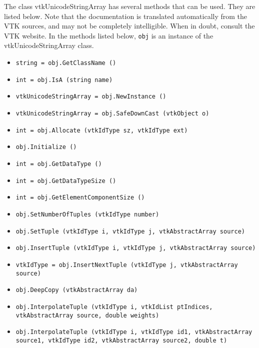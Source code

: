 The class vtkUnicodeStringArray has several methods that can be used.
  They are listed below.
Note that the documentation is translated automatically from the VTK sources,
and may not be completely intelligible.  When in doubt, consult the VTK website.
In the methods listed below, \verb|obj| is an instance of the vtkUnicodeStringArray class.
\begin{itemize}
\item  \verb|string = obj.GetClassName ()|

\item  \verb|int = obj.IsA (string name)|

\item  \verb|vtkUnicodeStringArray = obj.NewInstance ()|

\item  \verb|vtkUnicodeStringArray = obj.SafeDownCast (vtkObject o)|

\item  \verb|int = obj.Allocate (vtkIdType sz, vtkIdType ext)|

\item  \verb|obj.Initialize ()|

\item  \verb|int = obj.GetDataType ()|

\item  \verb|int = obj.GetDataTypeSize ()|

\item  \verb|int = obj.GetElementComponentSize ()|

\item  \verb|obj.SetNumberOfTuples (vtkIdType number)|

\item  \verb|obj.SetTuple (vtkIdType i, vtkIdType j, vtkAbstractArray source)|

\item  \verb|obj.InsertTuple (vtkIdType i, vtkIdType j, vtkAbstractArray source)|

\item  \verb|vtkIdType = obj.InsertNextTuple (vtkIdType j, vtkAbstractArray source)|

\item  \verb|obj.DeepCopy (vtkAbstractArray da)|

\item  \verb|obj.InterpolateTuple (vtkIdType i, vtkIdList ptIndices, vtkAbstractArray source, double weights)|

\item  \verb|obj.InterpolateTuple (vtkIdType i, vtkIdType id1, vtkAbstractArray source1, vtkIdType id2, vtkAbstractArray source2, double t)|


\end{itemize}

